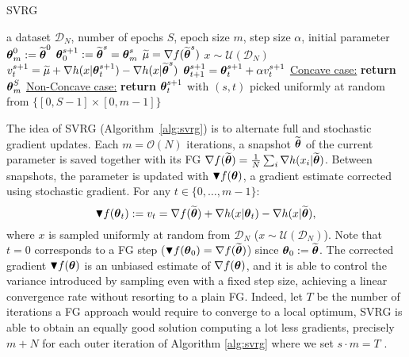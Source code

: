 \begin{algorithm}[h]
	\caption{SVRG}
	\label{alg:svrg}
	\begin{algorithmic}
		 a dataset $\mathcal{D}_N$, number of epochs $S$, epoch size $m$, step size $\alpha$, initial parameter $\boldsymbol{\theta}_{m}^0:=\widetilde{\boldsymbol{\theta}}^0$
		\STATE $\boldsymbol{\theta}_0^{s+1} := \widetilde{\boldsymbol{\theta}}^{s} = \boldsymbol{\theta}_{m}^s$
		\STATE $\widetilde{\mu} = \nabla f(\widetilde{\boldsymbol{\theta}}^s)$
		\STATE $x \sim \mathcal{U}\left(\mathcal{D}_N\right)$
		\STATE $v^{s+1}_t = 
		\widetilde{\mu} + 
		\nabla h(x|\boldsymbol{\theta}_t^{s+1}) -
		\nabla h(x|\widetilde{\boldsymbol{\theta}}^{s})
		$
		\STATE $\boldsymbol{\theta}_{t+1}^{s+1} = \boldsymbol{\theta}_t^{s+1} + \alpha v^{s+1}_t$
		\ENDFOR
		\ENDFOR
		\STATE \underline{Concave case:} \textbf{return} $\boldsymbol{\theta}_{m}^S$
		\STATE \underline{Non-Concave case:} \textbf{return} $\boldsymbol{\theta}_t^{s+1}$ with $(s,t)$ picked uniformly at random from $\{[0,S-1]\times[0,m-1]\}$
	\end{algorithmic}
\end{algorithm} 

The idea of \acs{SVRG} (Algorithm~\ref{alg:svrg}) is to alternate full and stochastic gradient updates. 
Each $m = \mathcal{O}(N)$ iterations, a snapshot $\widetilde{\boldsymbol{\theta}}$ of the current parameter is saved together with its \acs{FG} $\nabla f(\widetilde{\boldsymbol{\theta}}) = \frac{1}{N} \sum_i \nabla h(x_i|\widetilde{\boldsymbol{\theta}})$.
Between snapshots, the parameter is updated with $\blacktriangledown f(\boldsymbol{\theta})$, a gradient estimate corrected using stochastic gradient. For any $t \in \{0,\ldots,m-1\}$:
\begin{equation}\label{E:svrg.gradient.correction}
        \blacktriangledown f(\boldsymbol{\theta}_{t}) := v_t = \nabla f(\widetilde{\boldsymbol{\theta}}) + \nabla h(x | \boldsymbol{\theta}_t) - \nabla h(x | \widetilde{\boldsymbol{\theta}}),
\end{equation} 
where $x$ is sampled uniformly at random from $\mathcal{D}_N$ (\ie $x \sim \mathcal{U}(\mathcal{D}_N)$).
Note that $t=0$ corresponds to a \acs{FG} step (\ie $\blacktriangledown f(\boldsymbol{\theta}_0) = \nabla f(\widetilde{\boldsymbol{\theta}})$) since $\boldsymbol{\theta}_0 := \widetilde{\boldsymbol{\theta}}$.
The corrected gradient $\blacktriangledown f(\boldsymbol{\theta})$ is an unbiased estimate of $\nabla f(\boldsymbol{\theta})$, and it is able to control the variance introduced by sampling even with a fixed step size, achieving a linear convergence rate without resorting to a plain \acs{FG}. Indeed, let $T$ be the number of iterations a \acs{FG} approach would require to converge to a local optimum, \acs{SVRG} is able to obtain an equally good solution computing a lot less gradients, precisely $m+N$ for each outer iteration of Algorithm \ref{alg:svrg} where we set $s\cdot m=T$ \citep{johnson2013accelerating}.

